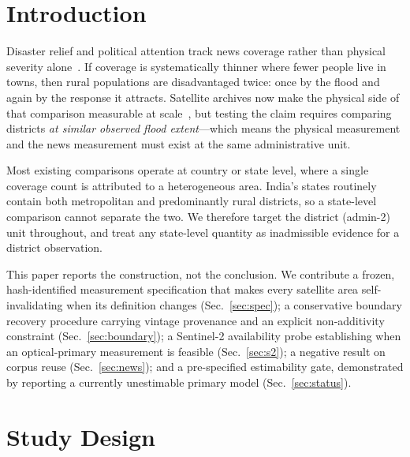 \documentclass[conference]{IEEEtran}
\begin{document}
\section{Introduction}
Disaster relief and political attention track news coverage rather than physical
severity alone~\cite{eisensee2007}. If coverage is systematically thinner where
fewer people live in towns, then rural populations are disadvantaged twice: once
by the flood and again by the response it attracts. Satellite archives now make
the physical side of that comparison measurable at scale~\cite{tellman2021}, but
testing the claim requires comparing districts \emph{at similar observed flood
extent}---which means the physical measurement and the news measurement must
exist at the same administrative unit.

Most existing comparisons operate at country or state level, where a single
coverage count is attributed to a heterogeneous area. India's states routinely
contain both metropolitan and predominantly rural districts, so a state-level
comparison cannot separate the two. We therefore target the district (admin-2)
unit throughout, and treat any state-level quantity as inadmissible evidence for
a district observation.

This paper reports the construction, not the conclusion. We contribute a frozen,
hash-identified measurement specification that makes every satellite area
self-invalidating when its definition changes (Sec.~\ref{sec:spec}); a
conservative boundary recovery procedure carrying vintage provenance and an
explicit non-additivity constraint (Sec.~\ref{sec:boundary}); a Sentinel-2
availability probe establishing when an optical-primary measurement is feasible
(Sec.~\ref{sec:s2}); a negative result on corpus reuse (Sec.~\ref{sec:news});
and a pre-specified estimability gate, demonstrated by reporting a currently
unestimable primary model (Sec.~\ref{sec:status}).

\section{Study Design}
\end{document}
